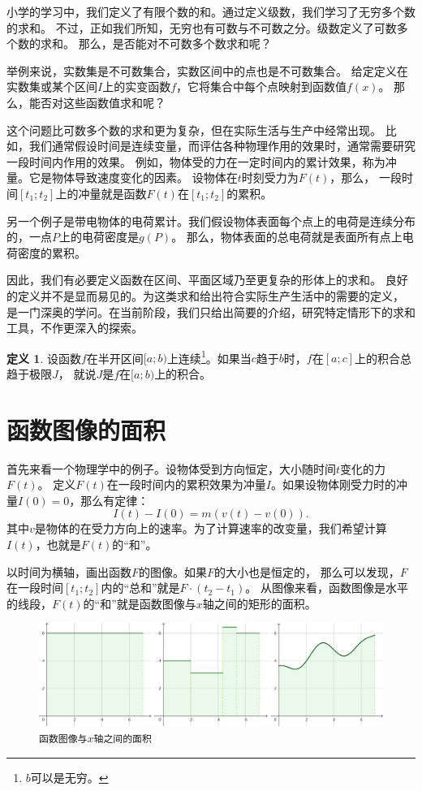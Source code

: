 \documentclass[12pt,UTF8]{ctexbook}
\theoremstyle{definition}
\newtheorem{df}{定义}[section]
\theoremstyle{plain}
\begin{document}
小学的学习中，我们定义了有限个数的和。通过定义级数，我们学习了无穷多个数的求和。
不过，正如我们所知，无穷也有可数与不可数之分。级数定义了可数多个数的求和。
那么，是否能对不可数多个数求和呢？

举例来说，实数集是不可数集合，实数区间中的点也是不可数集合。
给定定义在实数集或某个区间$I$上的实变函数$f$，它将集合中每个点映射到函数值$f(x)$。
那么，能否对这些函数值求和呢？

这个问题比可数多个数的求和更为复杂，但在实际生活与生产中经常出现。
比如，我们通常假设时间是连续变量，而评估各种物理作用的效果时，通常需要研究一段时间内作用的效果。
例如，物体受的力在一定时间内的累计效果，称为冲量。它是物体导致速度变化的因素。
设物体在$t$时刻受力为$F(t)$，那么，
一段时间$[t_1; t_2]$上的冲量就是函数$F(t)$在$[t_1; t_2]$的累积。

另一个例子是带电物体的电荷累计。我们假设物体表面每个点上的电荷是连续分布的，一点$P$上的电荷密度是$g(P)$。
那么，物体表面的总电荷就是表面所有点上电荷密度的累积。

因此，我们有必要定义函数在区间、平面区域乃至更复杂的形体上的求和。
良好的定义并不是显而易见的。为这类求和给出符合实际生产生活中的需要的定义，
是一门深奥的学问。在当前阶段，我们只给出简要的介绍，研究特定情形下的求和工具，不作更深入的探索。

\begin{df}
    设函数$f$在半开区间$[a;b)$上连续\footnote{$b$可以是无穷。}。如果当$c$趋于$b$时，$f$在$[a;c]$上的积合总趋于极限$J$，
    就说$J$是$f$在$[a;b)$上的积合。
\end{df}\section{函数图像的面积}

首先来看一个物理学中的例子。设物体受到方向恒定，大小随时间$t$变化的力$F(t)$。
定义$F(t)$在一段时间内的累积效果为冲量$I$。如果设物体刚受力时的冲量$I(0) = 0$，那么有定律：
$$ I(t) - I(0) = m(v(t) - v(0)).$$
其中$v$是物体的在受力方向上的速率。为了计算速率的改变量，我们希望计算$I(t)$，也就是$F(t)$的“和”。

以时间为横轴，画出函数$F$的图像。如果$F$的大小也是恒定的，
那么可以发现，$F$在一段时间$[t_1; t_2]$内的“总和”就是$F \cdot (t_2 - t_1)$。
从图像来看，函数图像是水平的线段，$F(t)$的“和”就是函数图像与$x$轴之间的矩形的面积。

\begin{figure}[h] %
    \vspace{4pt}
    \centering
    \includegraphics[width=\textwidth]{tu/积分定义1.png}
    \caption*{\texttt{函数图像与$x$轴之间的面积}}
\end{figure}
\end{document}
